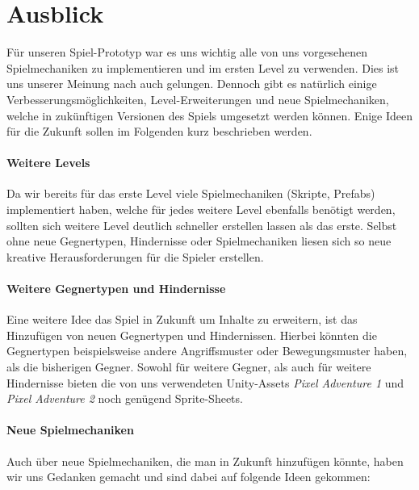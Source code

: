 \setlength{\parindent}{0em}

\chapter{Ausblick}

\label{Chapter3}

Für unseren Spiel-Prototyp war es uns wichtig alle von uns vorgesehenen Spielmechaniken zu implementieren und im ersten Level zu verwenden. Dies ist uns unserer Meinung nach auch gelungen. Dennoch gibt es natürlich einige Verbesserungsmöglichkeiten, Level-Erweiterungen und neue Spielmechaniken, welche in zukünftigen Versionen des Spiels umgesetzt werden können. Enige Ideen für die Zukunft sollen im Folgenden kurz beschrieben werden.

\subsubsection*{Weitere Levels}

Da wir bereits für das erste Level viele Spielmechaniken (Skripte, Prefabs) implementiert haben, welche für jedes weitere Level ebenfalls benötigt werden, sollten sich weitere Level deutlich schneller erstellen lassen als das erste. Selbst ohne neue Gegnertypen, Hindernisse oder Spielmechaniken liesen sich so neue kreative Herausforderungen für die Spieler erstellen.

\subsubsection*{Weitere Gegnertypen und Hindernisse}

Eine weitere Idee das Spiel in Zukunft um Inhalte zu erweitern, ist das Hinzufügen von neuen Gegnertypen und Hindernissen. Hierbei könnten die Gegnertypen beispielsweise andere Angriffsmuster oder Bewegungsmuster haben, als die bisherigen Gegner. Sowohl für weitere Gegner, als auch für weitere Hindernisse bieten die von uns verwendeten Unity-Assets \textit{Pixel Adventure 1} und \textit{Pixel Adventure 2} noch genügend Sprite-Sheets.

\subsubsection*{Neue Spielmechaniken}

Auch über neue Spielmechaniken, die man in Zukunft hinzufügen könnte, haben wir uns Gedanken gemacht und sind dabei auf folgende Ideen gekommen:

